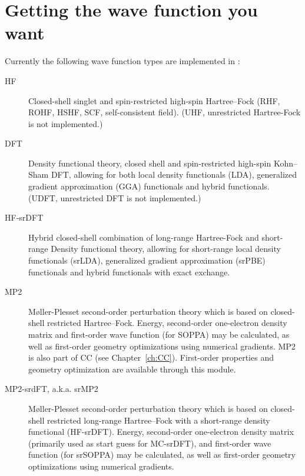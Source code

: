 \chapter{\label{ch:wf-guide}Getting the wave function you want}

Currently the following wave function types are implemented in \dalton:

\begin{description}

\item[HF] Closed-shell singlet and spin-restricted high-spin
Hartree--Fock (RHF, ROHF, HSHF, SCF, self-consistent field).
(UHF, unrestricted Hartree-Fock is not implemented.)

\item[DFT] Density functional theory, closed shell and spin-restricted high-spin Kohn--Sham DFT, allowing for both local density functionals (LDA), generalized gradient approximation (GGA) functionals and hybrid functionals.
(UDFT, unrestricted DFT is not implemented.)

\item[HF-srDFT] Hybrid closed-shell combination of long-range Hartree-Fock and short-range Density functional theory, allowing for short-range local density functionals (srLDA), generalized gradient approximation (srPBE) functionals and hybrid functionals with exact exchange.

\item[MP2]
M{\o}ller-Plesset second-order perturbation theory which is based on
closed-shell restricted Hartree--Fock.  Energy, second-order one-electron
density matrix and first-order wave function (for SOPPA) may be
calculated, as well as first-order geometry optimizations using
numerical gradients. MP2 is also part of CC (see Chapter~\ref{ch:CC}).
First-order properties and geometry optimization are available through
this module.  

\item[MP2-srdFT, a.k.a. srMP2]
M{\o}ller-Plesset second-order perturbation theory which is based on
closed-shell restricted long-range Hartree--Fock with a short-range density functional (HF-srDFT).
Energy, second-order one-electron density matrix (primarily used as start guess for MC-srDFT),
and first-order wave function (for srSOPPA) may be calculated,
as well as first-order geometry optimizations using numerical gradients.


\end{description}
